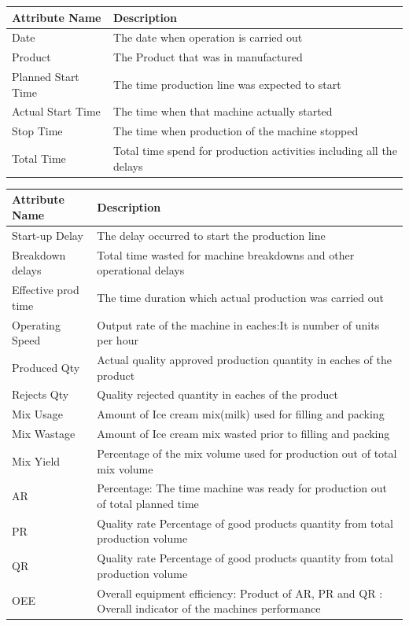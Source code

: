 \begin{center}
\begin{tabular}{ | m{1.5cm} | m{6cm} | } 
\hline
 Attribute Name & Description  \\ 
\hline \hline
Date & The date when operation is carried out  \\ 
 \hline
 Product & The Product that was in manufactured \\ 
 \hline
 Planned Start Time & The time production line was expected to start\\ 
 \hline
 Actual Start Time & The time when that machine actually started \\ 
 \hline
  Stop Time & The time when production of the machine  stopped \\ 
 \hline
  Total Time & Total time spend for production activities including all the delays \\ 
 \hline
 \end{tabular}
 \end{center}
 \begin{center}
 \begin{tabular}{ | m{1.5cm} | m{6cm} | } 
 \hline
 Attribute Name & Description  \\ 
\hline \hline

 Start-up Delay & The delay occurred to start the production line \\
 \hline
  Breakdown delays & Total time wasted for machine breakdowns and other operational delays \\ 
 \hline{}
 Effective prod time & The  time duration which actual production was carried out \\
 \hline
 Operating Speed & Output rate of the machine in eaches:It is number of units per hour \\
 \hline
 Produced Qty & Actual quality approved production quantity in eaches of the product
 \\
 \hline
 Rejects Qty & Quality rejected quantity in eaches of the product \\
 \hline
 Mix Usage & Amount of Ice cream mix(milk) used for filling and packing \\
 \hline
 Mix Wastage & Amount of Ice cream mix wasted prior to filling and packing \\
 \hline
 Mix Yield & Percentage of the mix volume used for production out of total mix volume \\
 \hline
 AR & Percentage: The time machine was ready for production out of total planned time \\
 \hline
 PR & Quality rate Percentage of good products quantity from total  production volume \\
\hline
 QR & Quality rate Percentage of good products quantity from total  production volume \\
\hline
 OEE & Overall equipment efficiency: Product of AR, PR and QR : Overall indicator of the machines  performance \\
\hline
\end{tabular}
\end{center}

